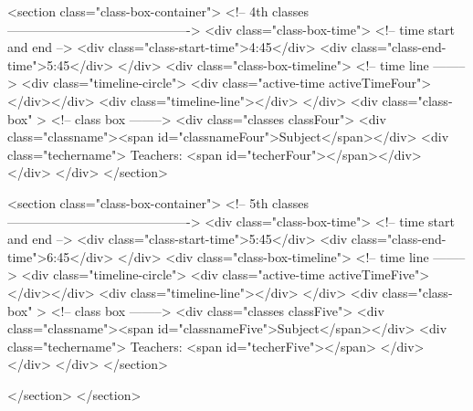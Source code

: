 <section class="class-box-container">    <!-- 4th classes-------------------------------------------> 
  <div class="class-box-time">          <!-- time start and end -->
  <div class="class-start-time">4:45</div>
  <div class="class-end-time">5:45</div>
  </div>
  <div class="class-box-timeline">      <!-- time line -------->
  <div class="timeline-circle"> <div class="active-time activeTimeFour"></div></div>
  <div class="timeline-line"></div>
  </div>
  <div class="class-box" >              <!-- class box -------->
  <div class="classes classFour">
  <div class="classname"><span id="classnameFour">Subject</span></div>
  <div class="techername"> Teachers: <span id="techerFour"></span></div>
 </div>
 </div> 
</section> 

<section class="class-box-container">    <!-- 5th classes-------------------------------------------> 
  <div class="class-box-time">          <!-- time start and end -->
  <div class="class-start-time">5:45</div>
  <div class="class-end-time">6:45</div>
  </div>
  <div class="class-box-timeline">      <!-- time line -------->
  <div class="timeline-circle"> <div class="active-time activeTimeFive"></div></div>
  <div class="timeline-line"></div>
  </div>
  <div class="class-box" >              <!-- class box -------->
  <div class="classes classFive">
  <div class="classname"><span id="classnameFive">Subject</span></div>
  <div class="techername"> Teachers: <span id="techerFive"></span> </div>
 </div>
 </div> 
</section> 



</section>
</section>
